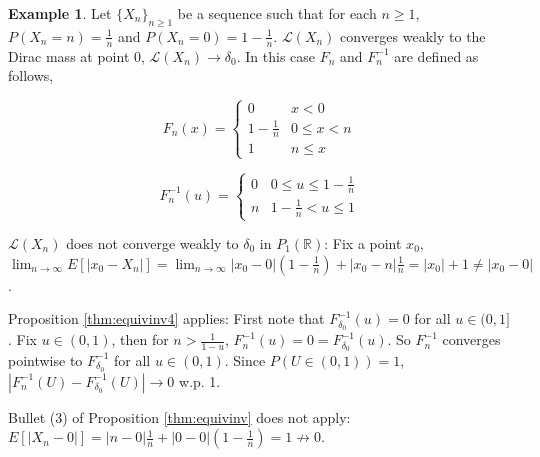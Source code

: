 \documentclass[12pt]{article}
\theoremstyle{plain}%
\theoremstyle{definition}
\newtheorem{example}{Example}[section]
\begin{document}
\begin{example}
	Let $\{X_n\}_{n\geq 1}$ be a sequence such that for each $n\geq 1$, $P(X_n=n)=\frac{1}{n}$ and $P(X_n=0)=1-\frac{1}{n}$. $\mathcal{L}(X_n)$ converges weakly to the Dirac mass at point 0, $\mathcal{L}(X_n)\to \delta_0$. In this case $F_n$ and $F^{-1}_n$ are defined as follows,
	
	\noindent\begin{minipage}{.5\linewidth}
		\[ F_n(x)=\begin{cases} 
			0 & x<0 \\
			1-\frac{1}{n} & 0\leq x <n \\
			1 & n\leq x 
		\end{cases}
		\]
	\end{minipage}%
	\begin{minipage}{.5\linewidth}
			\[ F^{-1}_n(u)=\begin{cases} 
			0 & 0\leq u \leq 1-\frac{1}{n} \\
			n & 1-\frac{1}{n}< u \leq 1 
		\end{cases}
		\]
	\end{minipage}
	
	$\mathcal{L}(X_n)$ does not converge weakly to $\delta_0$ in $P_1(\mathbb{R})$: Fix a point $x_0$, $\lim_{n\to \infty} E[|x_0-X_n|]=\lim_{n\to\infty}|x_0-0|(1-\frac{1}{n})+|x_0-n|\frac{1}{n}=|x_0|+1 \neq |x_0-0|$. 
	
Proposition \ref{thm:equivinv4} applies: First note that $F_{\delta_0}^{-1}(u)=0$ for all $u\in (0,1]$. Fix $u\in(0,1)$, then for $n>\frac{1}{1-u}$, $F^{-1}_n(u)=0=F_{\delta_0}^{-1}(u)$. So $F_n^{-1}$ converges pointwise to $F_{\delta_0}^{-1}$ for all $u\in (0,1)$. Since $P(U\in(0,1))=1$, $|F^{-1}_n(U)-F^{-1}_{\delta_0}(U)|\to 0$ w.p. 1.
	
	Bullet (3) of Proposition \ref{thm:equivinv} does not apply: $E[|X_n-0|]=|n-0|\frac{1}{n}+|0-0|(1-\frac{1}{n})=1\not\to 0$.
\end{example}
\end{document}
